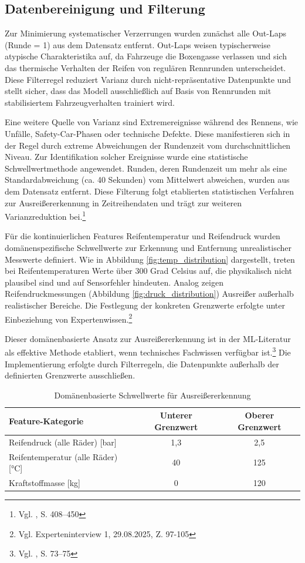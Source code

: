 \subsection{Datenbereinigung und Filterung}

Zur Minimierung systematischer Verzerrungen wurden zunächst alle Out-Laps (Runde = 1) aus dem Datensatz entfernt. Out-Laps weisen typischerweise atypische Charakteristika auf, da Fahrzeuge die Boxengasse verlassen und sich das thermische Verhalten der Reifen von regulären Rennrunden unterscheidet. Diese Filterregel reduziert Varianz durch nicht-repräsentative Datenpunkte und stellt sicher, dass das Modell ausschließlich auf Basis von Rennrunden mit stabilisiertem Fahrzeugverhalten trainiert wird.

Eine weitere Quelle von Varianz sind Extremereignisse während des Rennens, wie Unfälle, Safety-Car-Phasen oder technische Defekte. Diese manifestieren sich in der Regel durch extreme Abweichungen der Rundenzeit vom durchschnittlichen Niveau. Zur Identifikation solcher Ereignisse wurde eine statistische Schwellwertmethode angewendet. Runden, deren Rundenzeit um mehr als eine Standardabweichung (ca. 40 Sekunden) vom Mittelwert abweichen, wurden aus dem Datensatz entfernt. Diese Filterung folgt etablierten statistischen Verfahren zur Ausreißererkennung in Zeitreihendaten und trägt zur weiteren Varianzreduktion bei.\footnote{Vgl. \cite{Box2015}, S. 408–450}

Für die kontinuierlichen Features Reifentemperatur und Reifendruck wurden domänenspezifische Schwellwerte zur Erkennung und Entfernung unrealistischer Messwerte definiert. Wie in Abbildung \ref{fig:temp_distribution} dargestellt, treten bei Reifentemperaturen Werte über 300 Grad Celsius auf, die physikalisch nicht plausibel sind und auf Sensorfehler hindeuten. Analog zeigen Reifendruckmessungen (Abbildung \ref{fig:druck_distribution}) Ausreißer außerhalb realistischer Bereiche. 
Die Festlegung der konkreten Grenzwerte erfolgte unter Einbeziehung von Expertenwissen.\footnote{Vgl. Experteninterview 1, 29.08.2025, Z. 97-105} 

Dieser domänenbasierte Ansatz zur Ausreißererkennung ist in der \ac{ML}-Literatur als effektive Methode etabliert, wenn technisches Fachwissen verfügbar ist.\footnote{Vgl. \cite{Kuhn2019}, S. 73–75} Die Implementierung erfolgte durch Filterregeln, die Datenpunkte außerhalb der definierten Grenzwerte ausschließen.

\begin{table}[H]
  \centering
  \begin{tabular}{lcc}
    \toprule
    \textbf{Feature-Kategorie} & \textbf{Unterer Grenzwert} & \textbf{Oberer Grenzwert} \\
    \midrule
    Reifendruck (alle Räder) [bar] & 1,3 & 2,5 \\
    Reifentemperatur (alle Räder) [°C] & 40 & 125 \\
    Kraftstoffmasse [kg] & 0 & 120 \\
    \bottomrule
  \end{tabular}
  \caption{Domänenbasierte Schwellwerte für Ausreißererkennung}
  \label{tab:threshold_values}
\end{table}


